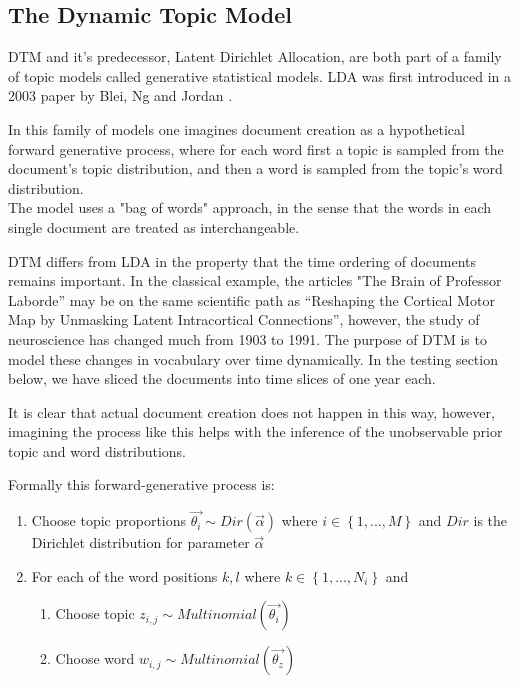 \documentclass[12pt,journal,letterpaper,oneside,onecolumn]{IEEEtran}
\begin{document}
\subsection{The Dynamic Topic Model}
DTM \cite{BleiLafferty2006} and it's predecessor, Latent Dirichlet Allocation, are both part of a family of topic models called generative statistical models. LDA was first introduced in a 2003 paper by Blei, Ng and Jordan \cite{BleiJordan2003}.

In this family of models one imagines document creation as a hypothetical forward generative process, where for each word first a topic is sampled from the document's topic distribution, and then a word is sampled from the topic's word distribution.
\\
The model uses a "bag of words" approach, in the sense that the words in each single document are treated as interchangeable. 

DTM differs from LDA in the property that the time ordering of documents remains important. In the classical example, the articles "The Brain of Professor Laborde” may be on the same scientific path as “Reshaping the Cortical Motor Map by Unmasking Latent Intracortical Connections”, however, the study of neuroscience has changed much from 1903 to 1991.
The purpose of DTM is to model these changes in vocabulary over time dynamically.
In the testing section below, we have sliced the documents into time slices of one year each.

It is clear that actual document creation does not happen in this way, however, imagining the process like this helps with the inference of the unobservable prior topic and word distributions. 

Formally this forward-generative process is:
\begin{enumerate}
	\item Choose topic proportions $\vec{\theta_i} \sim Dir ( \vec{\alpha} ) $ where $i \in \left\{1,...,M \right\} $ and $Dir$ is the Dirichlet distribution for parameter $\vec{\alpha}$ \\

	\item For each of the word positions $k,l$ where $k \in \left\{ 1,...,N_i \right\} $ and 
	\begin{enumerate}
		\item Choose topic $z_{i,j} \sim Multinomial(\vec{\theta_i})$
		\item Choose word $w_{i,j} \sim Multinomial(\vec{\theta_z})$
	\end{enumerate}
\end{enumerate}
\end{document}

